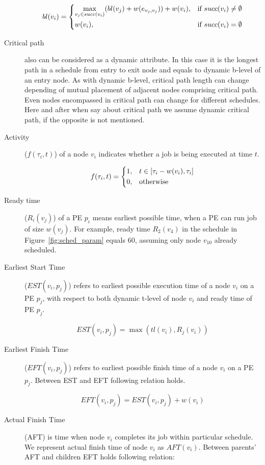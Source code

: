 \begin{description}
\[
bl(v_i) =
  \begin{dcases}
    \max_{v_j \in succ(v_i)}(bl(v_j)  + w(e_{v_j,v_j})) + w(v_i),& \text{if } succ(v_i) \neq \emptyset\\
    w(v_i), & \text{if } succ(v_i) = \emptyset
  \end{dcases}
\]

\item[Critical path] also can be considered as a dynamic attribute. In
  this case it is the longest path in a schedule from entry to exit
  node and equals to dynamic b-level of an entry node. As with dynamic
  b-level, critical path length can change depending of mutual
  placement of adjacent nodes comprising critical path. Even nodes
  encompassed in critical path can change for different
  schedules. Here and after when say about critical path we assume
  dynamic critical path, if the opposite is not mentioned.

\item[Activity] ($f(\tau_i, t)$) of a node $v_i$ indicates whether a
  job is being executed at time $t$.

\[
f(\tau_i, t) = 
\begin{dcases}
  1, & t \in 
  \left[
    \tau_i - w(v_i), \tau_i
  \right] \\
  0, & \text{otherwise}
\end{dcases}
\]

\item[Ready time] ($R_i(v_j)$) of a PE $p_i$ means earliest possible
  time, when a PE can run job of size $w(v_j)$. For example, ready
  time $R_2(v_4)$ in the schedule in Figure~\ref{fig:sched_param}
  equals $60$, assuming only node $v_{10}$ already scheduled.

\item[Earliest Start Time] ($EST(v_i, p_j)$) refers to earliest
  possible execution time of a node $v_i$ on a PE $p_j$, with respect
  to both dynamic t-level of node $v_i$ and ready time of PE $p_j$.

\[
EST(v_i, p_j) = \max(tl(v_i), R_j(v_i))
\]

\item[Earliest Finish Time] ($EFT(v_i, p_j)$) refers to earliest
  possible finish time of a node $v_i$ on a PE $p_j$. Between EST and
  EFT following relation holds.

\[
EFT(v_i, p_j) = EST(v_i, p_j) + w(v_i)
\]

\item[Actual Finish Time] (AFT) is time when node $v_i$ completes its
  job within particular schedule. We represent actual finish time of
  node $v_i$ as $AFT(v_i)$. Between parents' AFT and children EFT
  holds following relation:


\end{description}
